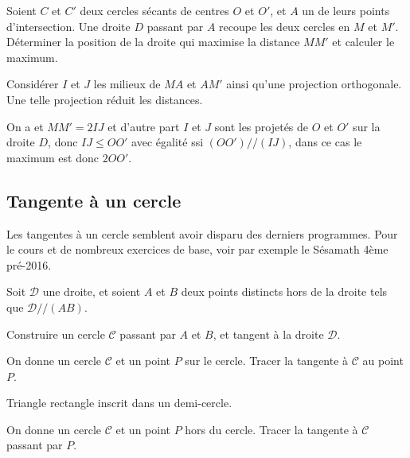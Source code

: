 \begin{exo}[Minimisation]
Soient $C$ et $C'$ deux cercles sécants de centres $O$ et $O'$, et $A$ un de leurs points d'intersection. Une droite $D$ passant par $A$ recoupe les deux cercles en $M$ et $M'$. Déterminer la position de la droite qui maximise la distance $MM'$ et calculer le maximum.

\begin{hint}   
Considérer $I$ et $J$ les milieux de $MA$ et $AM'$ ainsi qu'une projection orthogonale. Une telle projection réduit les distances.
\end{hint}      
\begin{sol} 
On a et $MM' = 2IJ$ et d'autre part $I$ et $J$ sont les projetés de $O$ et $O'$ sur la droite $D$, donc $IJ \leq OO'$ avec égalité ssi $(OO') // (IJ)$, dans ce cas le maximum est donc $2OO'$.
\end{sol}  
\end{exo}  

\subsection{Tangente à un cercle}

Les tangentes à un cercle semblent avoir disparu des derniers programmes. Pour le cours et de nombreux exercices de base, voir par exemple le Sésamath 4ème pré-2016.

\begin{exo}
\label{DPPparallele}
Soit $\mathcal D$ une droite, et soient $A$ et $B$ deux points distincts hors de la droite tels que $\mathcal D // (AB)$.

Construire un cercle $\mathcal C$ passant par $A$ et $B$, et tangent à la droite $\mathcal D$.
\end{exo}



\begin{exo}
On donne un cercle $\mathcal C$ et un point $P$ sur le cercle. Tracer la tangente à $\mathcal C$ au point $P$.
\end{exo}

\begin{exo}
\begin{prerequis} Triangle rectangle inscrit dans un demi-cercle.\end{prerequis}
On donne un cercle $\mathcal C$ et un point $P$ hors du cercle. Tracer la tangente à $\mathcal C$ passant par $P$.
\end{exo}


